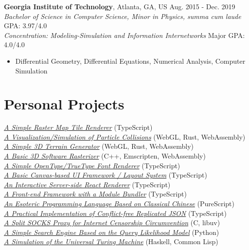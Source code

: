 \documentclass[12pt]{article}
\begin{document}
\textbf{Georgia Institute of Technology}, Atlanta, GA, US \hfill Aug. 2015 - Dec. 2019\\
\textit{Bachelor of Science in Computer Science, Minor in Physics, \textit{summa cum laude}} \hfill GPA: 3.97/4.0\\
\textit{Concentration: Modeling-Simulation and Information Internetworks} \hfill Major GPA: 4.0/4.0
\begin{itemize}
\small
\item Differential Geometry, Differential Equations, Numerical Analysis, Computer Simulation
\end{itemize}

\section*{Personal Projects}
\href{https://galmungral.github.io/mercator}{\textit{A Simple Raster Map Tile Renderer}} \hfill (TypeScript) \\
\href{https://galmungral.github.io/particle-simulation}{\textit{A Visualization/Simulation of Particle Collisions}} 
\hfill (WebGL, Rust, WebAssembly) \\
\href{https://galmungral.github.io/terrain-generator}{\textit{A Simple 3D Terrain Generator}} \hfill (WebGL, Rust, WebAssembly) \\
\href{https://galmungral.github.io/rasterizer?file=billboard.txt}{\textit{A Basic 3D Software Rasterizer}} \hfill (C++, Emscripten, WebAssembly) \\
\href{https://galmungral.github.io/text2svg}{\textit{A Simple OpenType/TrueType Font Renderer}} \hfill (TypeScript) \\
\href{https://galmungral.github.io/michelangelo}{\textit{A Basic Canvas-based UI Framework / Layout System}} \hfill (TypeScript) \\
\href{https://github.com/galmungral/react-teletype}{\textit{An Interactive Server-side React Renderer}} \hfill (TypeScript) \\
\href{https://github.com/galmungral/replay}{\textit{A Front-end Framework with a Module Bundler}} \hfill (TypeScript) \\
\href{https://galmungral.github.io/hanbun-lang}{\textit{An Esoteric Programming Language Based on Classical Chinese}} \hfill (PureScript) \\
\href{https://github.com/galmungral/json-crdt}{\textit{A Practical Implementation of Conflict-free Replicated JSON}} \hfill (TypeScript) \\
\href{https://github.com/galmungral/telescope}{\textit{A Split SOCKS Proxy for Internet Censorship Circumvention}} \hfill (C, libuv) \\
\href{https://github.com/galmungral/plato}{\textit{A Simple Search Engine Based on the Query Likelihood Model}} \hfill (Python) \\
\href{https://github.com/galmungral/turing-machine}{\textit{A Simulation of the Universal Turing Machine}} \hfill (Haskell, Common Lisp)
\end{document}
